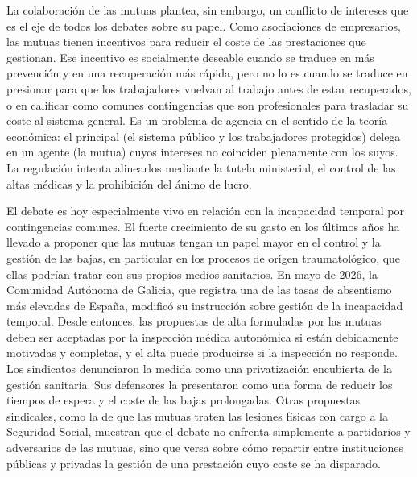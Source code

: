 \documentclass[10pt,a4paper]{article}
\begin{document}
La colaboración de las mutuas plantea, sin embargo, un conflicto de intereses que es el eje de todos los debates sobre su papel. Como asociaciones de empresarios, las mutuas tienen incentivos para reducir el coste de las prestaciones que gestionan. Ese incentivo es socialmente deseable cuando se traduce en más prevención y en una recuperación más rápida, pero no lo es cuando se traduce en presionar para que los trabajadores vuelvan al trabajo antes de estar recuperados, o en calificar como comunes contingencias que son profesionales para trasladar su coste al sistema general. Es un problema de agencia en el sentido de la teoría económica: el principal (el sistema público y los trabajadores protegidos) delega en un agente (la mutua) cuyos intereses no coinciden plenamente con los suyos. La regulación intenta alinearlos mediante la tutela ministerial, el control de las altas médicas y la prohibición del ánimo de lucro.

El debate es hoy especialmente vivo en relación con la incapacidad temporal por contingencias comunes. El fuerte crecimiento de su gasto en los últimos años ha llevado a proponer que las mutuas tengan un papel mayor en el control y la gestión de las bajas, en particular en los procesos de origen traumatológico, que ellas podrían tratar con sus propios medios sanitarios. En mayo de 2026, la Comunidad Autónoma de Galicia, que registra una de las tasas de absentismo más elevadas de España, modificó su instrucción sobre gestión de la incapacidad temporal. Desde entonces, las propuestas de alta formuladas por las mutuas deben ser aceptadas por la inspección médica autonómica si están debidamente motivadas y completas, y el alta puede producirse si la inspección no responde. Los sindicatos denunciaron la medida como una privatización encubierta de la gestión sanitaria. Sus defensores la presentaron como una forma de reducir los tiempos de espera y el coste de las bajas prolongadas. Otras propuestas sindicales, como la de que las mutuas traten las lesiones físicas con cargo a la Seguridad Social, muestran que el debate no enfrenta simplemente a partidarios y adversarios de las mutuas, sino que versa sobre cómo repartir entre instituciones públicas y privadas la gestión de una prestación cuyo coste se ha disparado.
\end{document}
